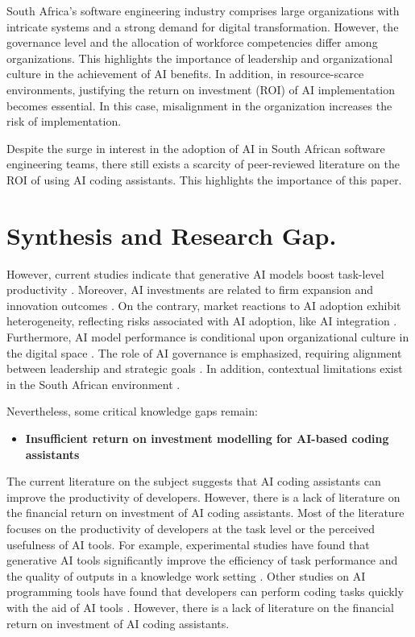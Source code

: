 South Africa's software engineering industry comprises large organizations with intricate systems and a strong demand for digital transformation. However, the governance level and the allocation of workforce competencies differ among organizations. This highlights the importance of leadership and organizational culture in the achievement of AI benefits. In addition, in resource-scarce environments, justifying the return on investment (ROI) of AI implementation becomes essential. In this case, misalignment in the organization increases the risk of implementation.

Despite the surge in interest in the adoption of AI in South African software engineering teams, there still exists a scarcity of peer-reviewed literature on the ROI of using AI coding assistants. This highlights the importance of this paper.

\section {Synthesis and Research Gap.}
\label{sec:Synthesis and Research Gap}
However, current studies indicate that generative AI models boost task-level productivity \autocite{Noy2023}. Moreover, AI investments are related to firm expansion and innovation outcomes \autocite{Babina2024}. On the contrary, market reactions to AI adoption exhibit heterogeneity, reflecting risks associated with AI adoption, like AI integration \autocite{Lui2021}. Furthermore, AI model performance is conditional upon organizational culture in the digital space \autocite{An2024}. The role of AI governance is emphasized, requiring alignment between leadership and strategic goals \autocite{Schneider2023}. In addition, contextual limitations exist in the South African environment \autocite{Poisat2024}.

Nevertheless, some critical knowledge gaps remain:
\begin{itemize}
	\item \textbf{Insufficient return on investment modelling for AI-based coding assistants} 
\end{itemize}
The current literature on the subject suggests that AI coding assistants can improve the productivity of developers. However, there is a lack of literature on the financial return on investment of AI coding assistants. Most of the literature focuses on the productivity of developers at the task level or the perceived usefulness of AI tools. For example, experimental studies have found that generative AI tools significantly improve the efficiency of task performance and the quality of outputs in a knowledge work setting \autocite{Noy2023}. Other studies on AI programming tools have found that developers can perform coding tasks quickly with the aid of AI tools \autocite{Peng2023}. However, there is a lack of literature on the financial return on investment of AI coding assistants.

